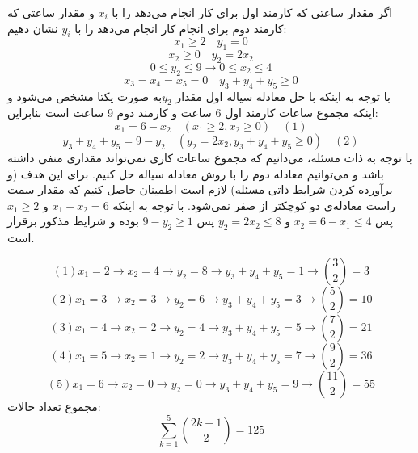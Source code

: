 \p
اگر مقدار ساعتی که کارمند اول برای کار 
انجام می‌دهد را با $x_i$ و مقدار ساعتی که کارمند دوم برای انجام کار
انجام می‌دهد را با $y_i$
نشان ‌دهیم:
$$ x_1 \geq 2 \quad y_1 = 0 $$
$$ x_2 \geq 0 \quad y_2 = 2x_2 $$
$$ 0 \leq y_2 \leq 9  \rightarrow  0 \leq x_2 \leq 4 $$
$$ x_3=x_4=x_5=0 \quad y_3  + y_4 + y_5 \geq 0 $$
\p
با توجه به اینکه با حل معادله سیاله اول مقدار $y_2$به صورت یکتا مشخص می‌شود و اینکه مجموع ساعات کارمند اول 6 ساعت و کارمند دوم 9 ساعت است بنابراین:
$$x_1 = 6 - x_2 \quad (x_1 \geq 2 , x_2 \geq  0)     \quad (1)$$
$$y_3 + y_4 + y_5 = 9-y_2 \quad (y_2 = 2x_2 , y_3 + y_4 + y_5  \geq 0) \quad (2)$$
\p
با توجه به ذات مسئله، می‌دانیم که مجموع ساعات کاری نمی‌تواند مقداری منفی داشته باشد و می‌توانیم معادله دوم را با روش معادله سیاله حل کنیم. برای این هدف (و برآورده کردن شرایط ذاتی مسئله) لازم است اطمینان حاصل کنیم که مقدار سمت راست معادله‌ی دو کوچکتر از صفر نمی‌شود. با توجه به اینکه
$x_1 + x_2 = 6$
و
$x_1 \geq 2$
پس
$x_2 = 6 - x_1 \leq 4$
و
$y_2 = 2x_2 \leq 8$
پس
$9 - y_2 \geq 1$
بوده و شرایط مذکور برقرار است.

$$ (1) x_1 = 2\rightarrow x_2=4 \rightarrow y_2=8 \rightarrow y_3+y_4+y_5 = 1 \rightarrow \binom{3}{2} = 3$$
$$ (2) x_1 = 3\rightarrow x_2=3 \rightarrow y_2=6 \rightarrow y_3+y_4+y_5 = 3 \rightarrow \binom{5}{2} = 10$$
$$ (3) x_1 = 4\rightarrow x_2=2 \rightarrow y_2= 4\rightarrow y_3+y_4+y_5 = 5 \rightarrow \binom{7}{2} = 21$$
$$ (4) x_1 = 5\rightarrow x_2=1 \rightarrow y_2=2 \rightarrow y_3+y_4+y_5 = 7 \rightarrow \binom{9}{2} = 36 $$
$$ (5) x_1 = 6\rightarrow x_2=0 \rightarrow y_2=0 \rightarrow y_3+y_4+y_5 = 9 \rightarrow \binom{11}{2} = 55 $$
\p
مجموع تعداد حالات: 
$$\sum_{k=1}^{5} \binom{2k+1}{2} = 125$$
